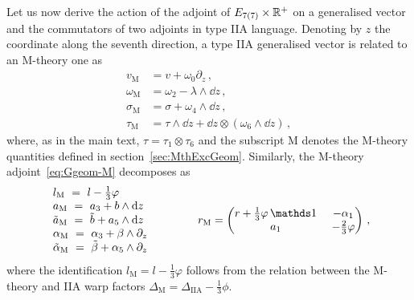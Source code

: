 \documentclass[debug]{phd}
\begin{document}
			Let us now derive the action of the adjoint of $E_{7(7)}\times \mathbb{R}^+$ on a generalised vector and the commutators of two adjoints in type IIA language. 
			Denoting by $z$ the coordinate along the seventh direction, a type IIA generalised vector is related to an M-theory one as
					\begin{equation}\label{redrules}
						\begin{split}
							v_{\mathrm{M}} &= v + \omega_0 \partial_z\, , \\
							\omega_{\mathrm{M}} &= \omega_2 - \lambda \wedge \dd z \, , \\
							\sigma_{\mathrm{M}} &= \sigma + \omega_4 \wedge \dd z\, , \\
							\tau_{\mathrm{M}} &= \tau \wedge \dd z + \dd z \otimes (\omega_6 \wedge \dd z)\, ,
						\end{split}
					\end{equation}
			where, as in the main text, $\tau = \tau_1 \otimes \tau_6$ and the subscript M denotes the M-theory quantities defined in section~\ref{sec:MthExcGeom}. 
			Similarly, the M-theory adjoint~\eqref{eq:Ggeom-M} decomposes as
					\begin{equation}\label{redrulesad}
						\begin{array}{l}
							l_{\mathrm{M}} \ =\ l - \tfrac13 \varphi\\
							a_{\mathrm{M}} \ =\ a_3 + b \wedge \dd z \\
							\tilde a_{\mathrm{M}} \ = \ \tilde b + a_5 \wedge \dd z \\
							\alpha_{\mathrm{M}} \ =\ \alpha_3 + \beta \wedge \partial_z \\ 
							\tilde \alpha_{\mathrm{M}} \ =\ \tilde \beta + \alpha_5 \wedge \partial_z 
						\end{array}
							\qquad \qquad 
						r_{\mathrm{M}} = 	\begin{pmatrix} 
										r + \tfrac13 \varphi \,\id \,&\, - \alpha_1 \\ 
										a_1 \,&\, -\tfrac23 \varphi
									\end{pmatrix} \, ,
					\end{equation}
			where the identification $l_{\mathrm{M}} = l - \tfrac13 \varphi$ follows from the relation between the M-theory and IIA warp factors $\Delta_{\mathrm{M}} = \Delta_{\mathrm{IIA}} - \tfrac13 \phi$.
\end{document}
